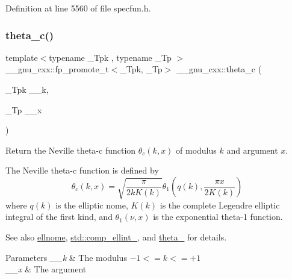 Definition at line 5560 of file specfun.\+h.

\mbox{\label{group__gnu__math__spec__func_ga3ebbb6513c39e1d55b08cba7d169ce3d}} 
\subsubsection{\texorpdfstring{theta\+\_\+c()}{theta\_c()}}
{\footnotesize\ttfamily template$<$typename \+\_\+\+Tpk , typename \+\_\+\+Tp $>$ \\
\+\_\+\+\_\+gnu\+\_\+cxx\+::fp\+\_\+promote\+\_\+t$<$\+\_\+\+Tpk, \+\_\+\+Tp$>$ \+\_\+\+\_\+gnu\+\_\+cxx\+::theta\+\_\+c (\begin{DoxyParamCaption}\item[{\+\_\+\+Tpk}]{\+\_\+\+\_\+k,  }\item[{\+\_\+\+Tp}]{\+\_\+\+\_\+x }\end{DoxyParamCaption})\hspace{0.3cm}{\ttfamily [inline]}}

Return the Neville theta-\/c function $ \theta_c(k,x) $ of modulus $ k $ and argument $ x $.

The Neville theta-\/c function is defined by \[ \theta_c(k,x) = \sqrt{\frac{\pi}{2 k K(k)}} \theta_1\left(q(k),\frac{\pi x}{2K(k)}\right) \] where $ q(k) $ is the elliptic nome, $ K(k) $ is the complete Legendre elliptic integral of the first kind, and $ \theta_1(\nu,x) $ is the exponential theta-\/1 function. \begin{DoxySeeAlso}{See also}
\hyperlink{group__gnu__math__spec__func_ga7bfb34f8b5c0ed7c72040f9cb7034bba}{ellnome}, \hyperlink{group__tr29124__math__spec__func_gad559217fb01e7a8b7a6e23eeedda64be}{std\+::comp\+\_\+ellint\+\_}, and \hyperlink{group__gnu__math__spec__func_gaa2e5a3a5f550fe032a596a8b01c878c0}{theta\+\_} for details.
\end{DoxySeeAlso}

\begin{DoxyParams}{Parameters}
{\em \+\_\+\+\_\+k} & The modulus $ -1 <= k <= +1 $ \\
\hline
{\em \+\_\+\+\_\+x} & The argument \\
\hline
\end{DoxyParams}


